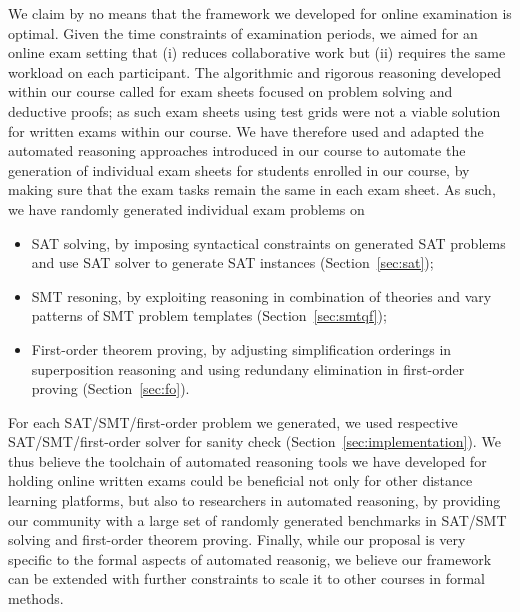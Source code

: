 We claim by no means that the framework we developed for online
examination is optimal.
Given the time constraints of examination periods, we aimed for an
online exam setting that (i) reduces collaborative work but (ii)
requires the same workload on each participant.
The algorithmic and rigorous reasoning developed within our
course called for exam sheets focused on problem solving and deductive
proofs; as such exam sheets using test grids were not a viable solution
for written exams within our course.
We have therefore used and adapted the automated reasoning approaches introduced in our
course to automate the generation of individual exam sheets for
students enrolled in our course, by making sure that the exam tasks
remain the same in each exam sheet. As such, we have randomly generated
individual exam problems on 
\begin{itemize}
\item SAT solving, by imposing syntactical constraints on generated
  SAT problems and use SAT solver to generate SAT instances (Section~\ref{sec:sat}); 
\item SMT resoning, by exploiting reasoning in combination of theories
  and vary patterns of SMT problem templates (Section~\ref{sec:smtqf}); 
\item First-order theorem proving, by adjusting simplification
  orderings in superposition reasoning and using redundany elimination
  in first-order proving (Section~\ref{sec:fo}). 
\end{itemize}
For each SAT/SMT/first-order problem we generated, we used respective
SAT/SMT/first-order solver for sanity check (Section~\ref{sec:implementation}).
We thus believe the toolchain of automated reasoning tools we have developed for
holding online written exams could be beneficial not only for other
distance learning platforms, but also to researchers in automated
reasoning, by providing our community with a large set of randomly generated benchmarks in SAT/SMT solving and first-order theorem proving.
Finally, while our proposal is very specific to the formal aspects of automated
reasonig, we believe our framework can be extended with further
constraints to scale it to other courses in formal methods. 

